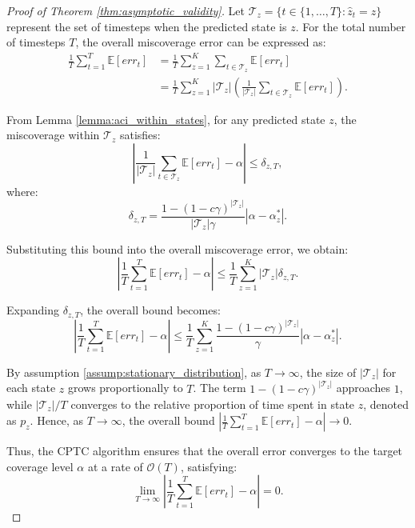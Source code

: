  
\begin{proof}[Proof of Theorem \ref{thm:asymptotic_validity}]
Let \( \mathcal{T}_z = \{ t \in \{1, \dots, T\} : \hat{z}_t = z \} \) represent the set of timesteps when the predicted state is \( z \). For the total number of timesteps \( T \), the overall miscoverage error can be expressed as:
\begin{align*}
\frac{1}{T} \sum_{t=1}^T \mathbb{E}[err_t] & = \frac{1}{T} \sum_{z=1}^K \sum_{t \in \mathcal{T}_z} \mathbb{E}[err_t]\\
&= \frac{1}{T} \sum_{z=1}^K |\mathcal{T}_z| \left( \frac{1}{|\mathcal{T}_z|} \sum_{t \in \mathcal{T}_z} \mathbb{E}[err_t] \right).
\end{align*}

From Lemma \ref{lemma:aci_within_states}, for any predicted state \( z \), the miscoverage within \( \mathcal{T}_z \) satisfies:
\[
\left| \frac{1}{|\mathcal{T}_z|} \sum_{t \in \mathcal{T}_z} \mathbb{E}[err_t] - \alpha \right| \leq \delta_{z,T},
\]
where:
\[
\delta_{z,T} = \frac{1 - (1-c\gamma)^{|\mathcal{T}_z|}}{|\mathcal{T}_z| \gamma} |\alpha - \alpha^{*}_z|.
\]

Substituting this bound into the overall miscoverage error, we obtain:
\[
\left| \frac{1}{T} \sum_{t=1}^T \mathbb{E}[err_t] - \alpha \right| \leq \frac{1}{T} \sum_{z=1}^K |\mathcal{T}_z| \delta_{z,T}.
\]

Expanding \( \delta_{z,T} \), the overall bound becomes:
\[
\left| \frac{1}{T} \sum_{t=1}^T \mathbb{E}[err_t] - \alpha \right| \leq \frac{1}{T} \sum_{z=1}^K \frac{ 1 - (1-c\gamma)^{|\mathcal{T}_z|}}{\gamma} |\alpha - \alpha^{*}_z|.
\]

By assumption \ref{assump:stationary_distribution}, as \( T \to \infty \), the size of \( |\mathcal{T}_z| \) for each state \( z \) grows proportionally to \( T \). The term \( 1 - (1-c\gamma)^{|\mathcal{T}_z|} \) approaches \( 1 \), while \( |\mathcal{T}_z| / T \) converges to the relative proportion of time spent in state \( z \), denoted as \( p_z \). Hence, as \( T \to \infty \), the overall bound \(
\left| \frac{1}{T} \sum_{t=1}^T \mathbb{E}[err_t] - \alpha \right| \to  0\).

Thus, the CPTC algorithm ensures that the overall error converges to the target coverage level \( \alpha \) at a rate of \( \mathcal{O}(T) \), satisfying:
\[
\lim_{T \to \infty} \left| \frac{1}{T} \sum_{t=1}^T \mathbb{E}[err_t] - \alpha \right| = 0.
\]
\end{proof}



